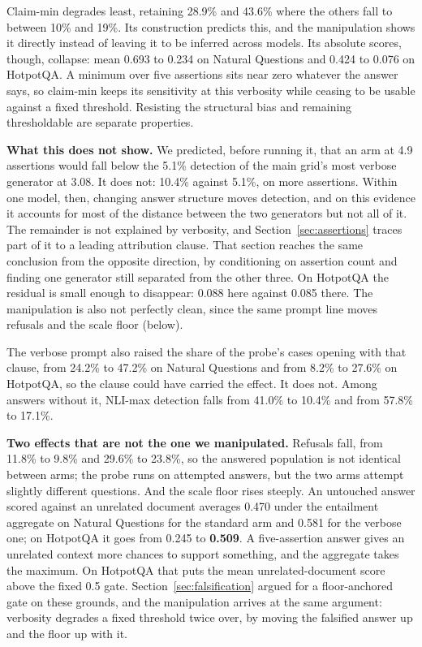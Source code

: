 \documentclass[11pt]{article}
\begin{document}
Claim-min degrades least, retaining 28.9\% and 43.6\% where the others fall to between 10\% and 19\%. Its construction predicts this, and the manipulation shows it directly instead of leaving it to be inferred across models. Its absolute scores, though, collapse: mean 0.693 to 0.234 on Natural Questions and 0.424 to 0.076 on HotpotQA. A minimum over five assertions sits near zero whatever the answer says, so claim-min keeps its sensitivity at this verbosity while ceasing to be usable against a fixed threshold. Resisting the structural bias and remaining thresholdable are separate properties.

\textbf{What this does not show.} We predicted, before running it, that an arm at 4.9 assertions would fall below the 5.1\% detection of the main grid's most verbose generator at 3.08. It does not: 10.4\% against 5.1\%, on more assertions. Within one model, then, changing answer structure moves detection, and on this evidence it accounts for most of the distance between the two generators but not all of it. The remainder is not explained by verbosity, and Section~\ref{sec:assertions} traces part of it to a leading attribution clause. That section reaches the same conclusion from the opposite direction, by conditioning on assertion count and finding one generator still separated from the other three. On HotpotQA the residual is small enough to disappear: 0.088 here against 0.085 there. The manipulation is also not perfectly clean, since the same prompt line moves refusals and the scale floor (below).

The verbose prompt also raised the share of the probe's cases opening with that clause, from 24.2\% to 47.2\% on Natural Questions and from 8.2\% to 27.6\% on HotpotQA, so the clause could have carried the effect. It does not. Among answers without it, NLI-max detection falls from 41.0\% to 10.4\% and from 57.8\% to 17.1\%.

\textbf{Two effects that are not the one we manipulated.} Refusals fall, from 11.8\% to 9.8\% and 29.6\% to 23.8\%, so the answered population is not identical between arms; the probe runs on attempted answers, but the two arms attempt slightly different questions. And the scale floor rises steeply. An untouched answer scored against an unrelated document averages 0.470 under the entailment aggregate on Natural Questions for the standard arm and 0.581 for the verbose one; on HotpotQA it goes from 0.245 to \textbf{0.509}. A five-assertion answer gives an unrelated context more chances to support something, and the aggregate takes the maximum. On HotpotQA that puts the mean unrelated-document score above the fixed 0.5 gate. Section~\ref{sec:falsification} argued for a floor-anchored gate on these grounds, and the manipulation arrives at the same argument: verbosity degrades a fixed threshold twice over, by moving the falsified answer up and the floor up with it.
\end{document}
